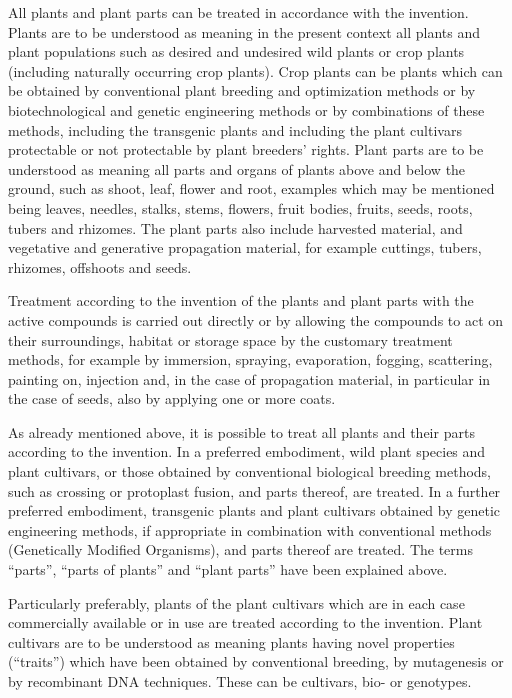 \documentclass[11pt,a4paper]{article}
\begin{document}
All plants and plant parts can be treated in accordance with the invention. Plants are to be understood as meaning in the present context all plants and plant populations such as desired and undesired wild plants or crop plants (including naturally occurring crop plants). Crop plants can be plants which can be obtained by conventional plant breeding and optimization methods or by biotechnological and genetic engineering methods or by combinations of these methods, including the transgenic plants and including the plant cultivars protectable or not protectable by plant breeders' rights. Plant parts are to be understood as meaning all parts and organs of plants above and below the ground, such as shoot, leaf, flower and root, examples which may be mentioned being leaves, needles, stalks, stems, flowers, fruit bodies, fruits, seeds, roots, tubers and rhizomes. The plant parts also include harvested material, and vegetative and generative propagation material, for example cuttings, tubers, rhizomes, offshoots and seeds.

Treatment according to the invention of the plants and plant parts with the active compounds is carried out directly or by allowing the compounds to act on their surroundings, habitat or storage space by the customary treatment methods, for example by immersion, spraying, evaporation, fogging, scattering, painting on, injection and, in the case of propagation material, in particular in the case of seeds, also by applying one or more coats.

As already mentioned above, it is possible to treat all plants and their parts according to the invention. In a preferred embodiment, wild plant species and plant cultivars, or those obtained by conventional biological breeding methods, such as crossing or protoplast fusion, and parts thereof, are treated. In a further preferred embodiment, transgenic plants and plant cultivars obtained by genetic engineering methods, if appropriate in combination with conventional methods (Genetically Modified Organisms), and parts thereof are treated. The terms “parts”, “parts of plants” and “plant parts” have been explained above.

Particularly preferably, plants of the plant cultivars which are in each case commercially available or in use are treated according to the invention. Plant cultivars are to be understood as meaning plants having novel properties (“traits”) which have been obtained by conventional breeding, by mutagenesis or by recombinant DNA techniques. These can be cultivars, bio- or genotypes.
\end{document}
